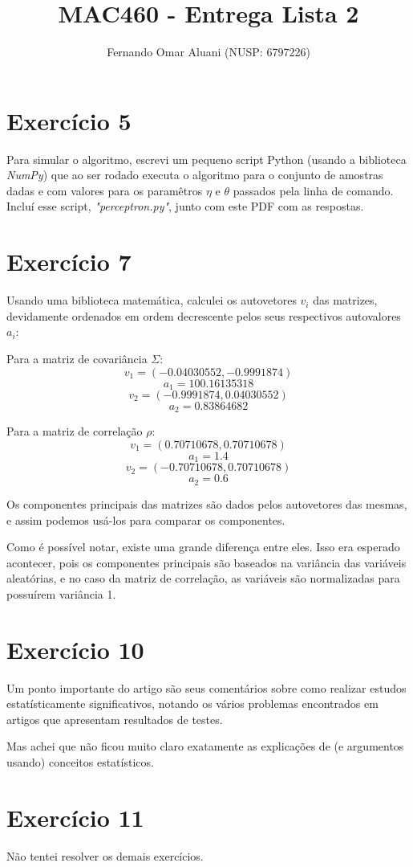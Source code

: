 \documentclass[a4paper,11pt]{article}
\title{MAC460 - Entrega Lista 2}
\author{Fernando Omar Aluani (NUSP: 6797226)}
\begin{document}
\maketitle

\section{Exercício 5}

Para simular o algoritmo, escrevi um pequeno script Python (usando a biblioteca \textit{NumPy})
que ao ser rodado executa o algoritmo para o conjunto de amostras dadas e com valores para os
paramêtros $\eta$ e $\theta$ passados pela linha de comando. Incluí esse script, \textit{"perceptron.py"}, 
junto com este PDF com as respostas.




\section{Exercício 7}

Usando uma biblioteca matemática, calculei os autovetores $v_{i}$ das matrizes, devidamente
ordenados em ordem decrescente pelos seus respectivos autovalores $a_{i}$:

Para a matriz de covariância $\Sigma$:
$$v_{1} = (-0.04030552, -0.9991874) $$
$$a_{1} = 100.16135318 $$
$$v_{2} = (-0.9991874 ,  0.04030552) $$
$$a_{2} = 0.83864682 $$

Para a matriz de correlação $\rho $:
$$v_{1} = (0.70710678,  0.70710678) $$
$$a_{1} = 1.4 $$
$$v_{2} = (-0.70710678,  0.70710678) $$
$$a_{2} = 0.6 $$

Os componentes principais das matrizes são dados pelos autovetores das mesmas, e assim podemos
usá-los para comparar os componentes. 

Como é possível notar, existe uma grande diferença entre eles. Isso era esperado acontecer,
pois os componentes principais são baseados na variância das variáveis aleatórias, e no caso
da matriz de correlação, as variáveis são normalizadas para possuírem variância 1.

\section{Exercício 10}

Um ponto importante do artigo são seus comentários sobre como realizar estudos estatísticamente significativos,
notando os vários problemas encontrados em artigos que apresentam resultados de testes.

Mas achei que não ficou muito claro exatamente as explicações de (e argumentos usando) conceitos estatísticos. 


\section{Exercício 11}

Não tentei resolver os demais exercícios.
\end{document}
